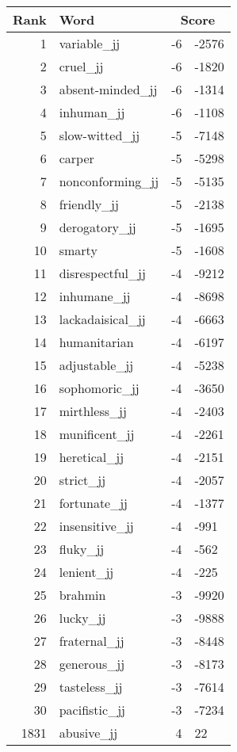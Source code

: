 \begin{longtable}[!htbp]{| rlr@{.}l |}
    \hline
    \textbf{Rank} & \textbf{Word} & \multicolumn{2}{c|}{\textbf{Score}} \\
    \hline
    \endhead
    1 & variable\_jj & -6 & -2576 \\
    2 & cruel\_jj & -6 & -1820 \\
    3 & absent-minded\_jj & -6 & -1314 \\
    4 & inhuman\_jj & -6 & -1108 \\
    5 & slow-witted\_jj & -5 & -7148 \\
    6 & carper & -5 & -5298 \\
    7 & nonconforming\_jj & -5 & -5135 \\
    8 & friendly\_jj & -5 & -2138 \\
    9 & derogatory\_jj & -5 & -1695 \\
    10 & smarty & -5 & -1608 \\
    11 & disrespectful\_jj & -4 & -9212 \\
    12 & inhumane\_jj & -4 & -8698 \\
    13 & lackadaisical\_jj & -4 & -6663 \\
    14 & humanitarian & -4 & -6197 \\
    15 & adjustable\_jj & -4 & -5238 \\
    16 & sophomoric\_jj & -4 & -3650 \\
    17 & mirthless\_jj & -4 & -2403 \\
    18 & munificent\_jj & -4 & -2261 \\
    19 & heretical\_jj & -4 & -2151 \\
    20 & strict\_jj & -4 & -2057 \\
    21 & fortunate\_jj & -4 & -1377 \\
    22 & insensitive\_jj & -4 & -991 \\
    23 & fluky\_jj & -4 & -562 \\
    24 & lenient\_jj & -4 & -225 \\
    25 & brahmin & -3 & -9920 \\
    26 & lucky\_jj & -3 & -9888 \\
    27 & fraternal\_jj & -3 & -8448 \\
    28 & generous\_jj & -3 & -8173 \\
    29 & tasteless\_jj & -3 & -7614 \\
    30 & pacifistic\_jj & -3 & -7234 \\
    1831 & abusive\_jj & 4 & 22 \\

\end{longtable}
